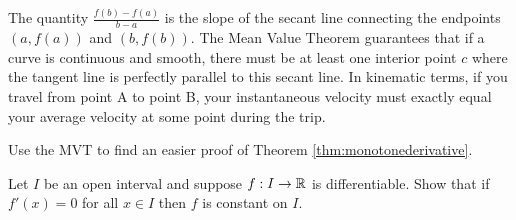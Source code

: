 \documentclass[../analysis1.tex]{subfiles}
\begin{document}
\begin{remark}
    The quantity $\frac{f(b) - f(a)}{b - a}$ is the slope of the secant line connecting the endpoints $(a, f(a))$ and $(b, f(b))$. The Mean Value Theorem guarantees that if a curve is continuous and smooth, there must be at least one interior point $c$ where the tangent line is perfectly parallel to this secant line. In kinematic terms, if you travel from point A to point B, your instantaneous velocity must exactly equal your average velocity at some point during the trip.
\end{remark}

\begin{exercise*}
    Use the MVT to find an easier proof of Theorem \ref{thm:monotonederivative}.
\end{exercise*}
\begin{exercise*}
    Let $I$ be an open interval and suppose $f:I\to\mathbb{R}$ is differentiable. Show that if $f'(x)=0$ for all $x\in I$ then $f$ is constant on $I$.
\end{exercise*}
\end{document}
